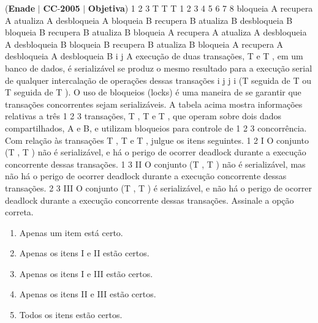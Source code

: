 \documentclass{exam}
\begin{document}
\begin{questions}
\question (\textbf{Enade} $|$ \textbf{CC}-\textbf{2005} $|$ \textbf{Objetiva})
1 2 3
T T T
1
2
3
4
5
6
7
8
bloqueia A
recupera A
atualiza A
desbloqueia A
bloqueia B
recupera B
atualiza B
desbloqueia B
bloqueia B
recupera B
atualiza B
bloqueia A
recupera A
atualiza A
desbloqueia A
desbloqueia B
bloqueia B
recupera B
atualiza B
bloqueia A
recupera A
desbloqueia A
desbloqueia B
i j
A execução de duas transações, T e T , em um banco de dados,
é serializável se produz o mesmo resultado para a execução serial
de qualquer intercalação de operações dessas transações
i j j i
(T seguida de T ou T seguida de T ). O uso de bloqueios (locks)
é uma maneira de se garantir que transações concorrentes sejam
serializáveis. A tabela acima mostra informações relativas a três
1 2 3
transações, T , T e T , que operam sobre dois dados
compartilhados, A e B, e utilizam bloqueios para controle de
1 2 3
concorrência. Com relação às transações T , T e T , julgue os
itens seguintes.
1 2
I O conjunto (T , T ) não é serializável, e há o perigo de
ocorrer deadlock durante a execução concorrente dessas
transações.
1 3
II O conjunto (T , T ) não é serializável, mas não há o perigo de
ocorrer deadlock durante a execução concorrente dessas
transações.
2 3
III O conjunto (T , T ) é serializável, e não há o perigo de
ocorrer deadlock durante a execução concorrente dessas
transações.
Assinale a opção correta.
	\begin{enumerate}[label=\alph*)]
		\item  Apenas um item está certo.
		\item  Apenas os itens I e II estão certos.
		\item  Apenas os itens I e III estão certos.
		\item  Apenas os itens II e III estão certos.
		\item  Todos os itens estão certos.
	\end{enumerate}


\end{questions}
\end{document}
